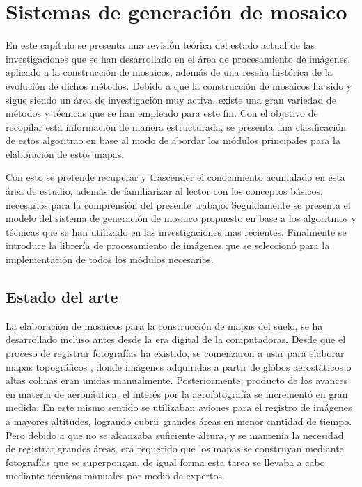 \chapter{Sistemas de generación de mosaico}
\label{capitulo2}

En este capítulo se presenta una revisión teórica del estado actual de las investigaciones que se han desarrollado en el área de procesamiento de imágenes, aplicado a la construcción de mosaicos, además de una reseña histórica de la evolución de dichos métodos. Debido a que la construcción de mosaicos ha sido y sigue siendo un área de investigación muy activa, existe una gran variedad de métodos y técnicas que se han empleado para este fin. Con el objetivo de recopilar esta información de manera estructurada, se presenta una clasificación de estos algoritmo en base al modo de abordar los módulos principales para la elaboración de estos mapas.

Con esto se pretende recuperar y trascender el conocimiento acumulado en esta área de estudio, además de familiarizar al lector con los conceptos básicos, necesarios para la comprensión del presente trabajo. Seguidamente se presenta el modelo del sistema de generación de mosaico propuesto en base a los algoritmos y técnicas que se han utilizado en las investigaciones mas recientes. Finalmente se introduce la librería de procesamiento de imágenes que se seleccionó para la implementación de todos los módulos necesarios.

\section{Estado del arte}

La elaboración de mosaicos para la construcción de mapas del suelo, se ha desarrollado incluso antes desde la era digital de la computadoras. Desde que el proceso de registrar fotografías ha existido, se comenzaron a usar para elaborar mapas topográficos \cite{primeros-mapas}, donde imágenes adquiridas a partir de globos aerostáticos o altas colinas eran unidas manualmente. Posteriormente, producto de los avances en materia de aeronáutica, el interés por la aerofotografía se incrementó en gran medida. En este mismo sentido se utilizaban aviones para el registro de imágenes a mayores altitudes, logrando cubrir grandes áreas en menor cantidad de tiempo. Pero debido a que no se alcanzaba suficiente altura, y se mantenía la necesidad de registrar grandes áreas, era requerido que los mapas se construyan mediante fotografías que se superpongan, de igual forma esta tarea se llevaba a cabo mediante técnicas manuales por medio de expertos.

